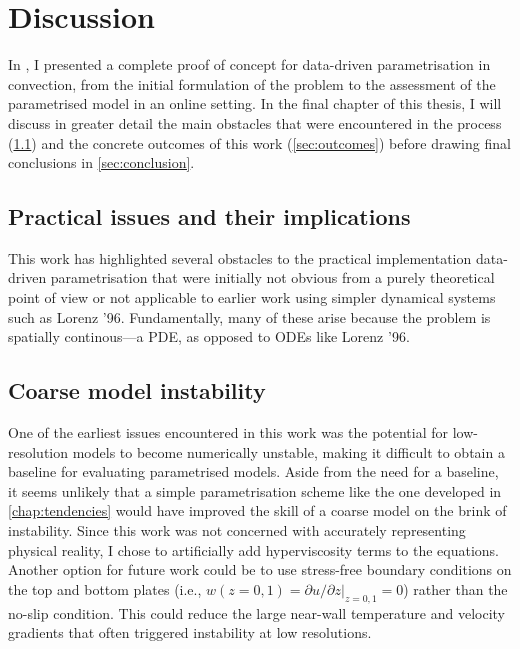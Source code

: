 \documentclass[../main.tex]{subfiles}
\begin{document}
\ifSubfilesClassLoaded{
    \frontmatter
    \tableofcontents
    \mainmatter
}{}

\chapter{Discussion} \label{chap:conclusion}
\setlength{\epigraphwidth}{.45\textwidth}
In , I presented a
complete proof of concept for data-driven parametrisation in \rb{} convection,
from the initial formulation of the problem to the assessment of the
parametrised model in an online setting. In the final chapter of this thesis, I
will discuss in greater detail the main obstacles that were encountered in the
process (\cref{sec:issues}) and the concrete outcomes of this work
(\cref{sec:outcomes}) before drawing final conclusions in
\cref{sec:conclusion}.


\section{Practical issues and their implications} \label{sec:issues}
This work has highlighted several obstacles to the practical implementation
data-driven parametrisation that were initially not obvious from a purely
theoretical point of view or not applicable to earlier work using simpler
dynamical systems such as Lorenz '96. Fundamentally, many of these arise
because the \rb{} problem is spatially continous---a PDE, as opposed to ODEs
like Lorenz '96.


\section{Coarse model instability}
One of the earliest issues encountered in this work was the potential for
low-resolution models to become numerically unstable, making it difficult to
obtain a baseline for evaluating parametrised models. Aside from the need for
a baseline, it seems unlikely that a simple parametrisation scheme like the one
developed in \cref{chap:tendencies} would have improved the skill of a
coarse model on the brink of instability. Since this work was not concerned
with accurately representing physical reality, I chose to artificially add
hyperviscosity terms to the equations. Another option for future work could be
to use stress-free boundary conditions on the top and bottom plates (i.e.,
$w(z=0,1) = \partial u/\partial z|_{z=0,1} = 0$) rather than the no-slip
condition. This could reduce the large near-wall temperature and velocity
gradients that often triggered instability at low resolutions.
\end{document}
